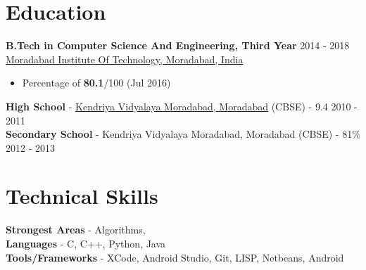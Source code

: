 \documentclass[margin, centered]{res}
\begin{document}
\begin{resume}

\section{Education}
\textbf{B.Tech in Computer Science And Engineering, Third Year} \hfill 2014 - 2018 \\
\href{http://mitmoradabad.edu.in}{Moradabad Institute Of Technology, Moradabad, India}
\begin{itemize}
 \item Percentage of \textbf{80.1}/100 (Jul 2016)
\end{itemize}
\textbf{High School} - \href{http://kvmoradabad.ac.in/}{Kendriya Vidyalaya Moradabad, Moradabad} (CBSE) - 9.4 \hfill 2010 - 2011 \\
\textbf{Secondary School} - Kendriya Vidyalaya Moradabad, Moradabad (CBSE) - 81\% \hfill 2012 - 2013
 



\section{Technical \hspace{2mm} Skills}
\textbf{Strongest Areas} -  Algorithms,  \\
\textbf{Languages} - C, C++, Python, Java\\
\textbf{Tools/Frameworks} - XCode, Android Studio, Git, LISP, Netbeans, Android





\end{resume}
\end{document}

